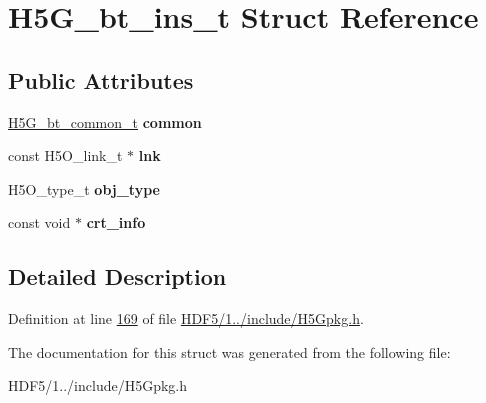 \hypertarget{struct_h5_g__bt__ins__t}{}\section{H5\+G\+\_\+bt\+\_\+ins\+\_\+t Struct Reference}
\label{struct_h5_g__bt__ins__t}
\subsection*{Public Attributes}
\begin{DoxyCompactItemize}
\item 
\mbox{\label{struct_h5_g__bt__ins__t_a7b7e1a8e9569f5b8b093ca5aeacac7e0}} 
\hyperlink{struct_h5_g__bt__common__t}{H5\+G\+\_\+bt\+\_\+common\+\_\+t} {\bfseries common}
\item 
\mbox{\label{struct_h5_g__bt__ins__t_a38e5ae0f3951ed3e9edec518416bacaf}} 
const H5\+O\+\_\+link\+\_\+t $\ast$ {\bfseries lnk}
\item 
\mbox{\label{struct_h5_g__bt__ins__t_ae97272df480caf6e18eb19df77faa954}} 
H5\+O\+\_\+type\+\_\+t {\bfseries obj\+\_\+type}
\item 
\mbox{\label{struct_h5_g__bt__ins__t_a2700d6f338c9a9a06b7ed0fcdf4f87d9}} 
const void $\ast$ {\bfseries crt\+\_\+info}
\end{DoxyCompactItemize}


\subsection{Detailed Description}


Definition at line \hyperlink{_h_d_f5_21_810_81_2include_2_h5_gpkg_8h_source_l00169}{169} of file \hyperlink{_h_d_f5_21_810_81_2include_2_h5_gpkg_8h_source}{H\+D\+F5/1../include/\+H5\+Gpkg.\+h}.



The documentation for this struct was generated from the following file\+:\begin{DoxyCompactItemize}
\item 
H\+D\+F5/1../include/\+H5\+Gpkg.\+h\end{DoxyCompactItemize}

